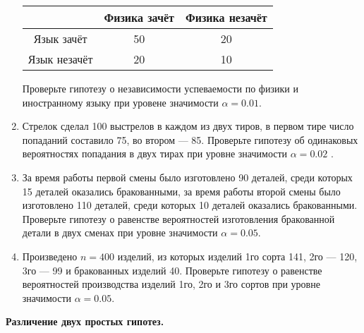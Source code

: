 \documentclass[a4paper,12pt]{article}
\newcommand{\theme}[1]{\hfil \textbf{#1} \hfil}
\begin{document}
\begin{enumerate}[topsep=1cm, parsep=1cm, resume]
              \begin{center}
                  \begin{tabular}{|c|c|c|}
                      \hline
                                   & Физика зачёт & Физика незачёт \\
                      \hline
                      Язык зачёт   & 50           & 20             \\
                      \hline
                      Язык незачёт & 20           & 10             \\
                      \hline
                  \end{tabular}
              \end{center}
              Проверьте гипотезу о независимости успеваемости по физики и иностранному языку при уровене значимости $\alpha = 0.01$.

        \item Стрелок сделал 100 выстрелов в каждом из двух тиров, в первом тире число попаданий составило 75, во втором --- 85.
              Проверьте гипотезу об одинаковых вероятностях попадания в двух тирах при уровне значимости $\alpha = 0.02$ .

        \item За время работы первой смены было изготовлено 90 деталей, среди которых 15 деталей оказались бракованными, за время работы второй смены было
              изготовлено 110 деталей, среди которых 10 деталей оказались бракованными. Проверьте гипотезу о равенстве вероятностей изготовления бракованной
              детали в двух сменах при уровне значимости $\alpha = 0.05$.

        \item Произведено $n = 400$ изделий, из которых изделий 1го сорта 141, 2го --- 120, 3го --- 99 и бракованных изделий 40. Проверьте гипотезу
              о равенстве вероятностей производства изделий 1го, 2го и 3го сортов при уровне значимости $\alpha = 0.05$.
    \end{enumerate}

    \theme{Различение двух простых гипотез.}
\end{document}
